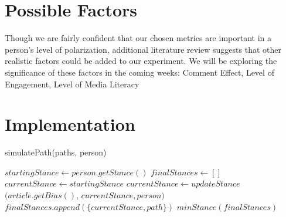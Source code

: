 \documentclass[11pt,reqno]{proc}
\begin{document}
\section{Possible Factors}
\hspace{\parindent} Though we are fairly confident that our chosen metrics are important in a person’s level of polarization, additional literature review suggests that other realistic factors could be added to our experiment. We will be exploring the significance of these factors in the coming weeks: Comment Effect, Level of Engagement, Level of Media Literacy
\section {Implementation}
\begin{center}
\end{center}

\begin{algorithm}
\caption{simulatePath(paths, person)}
\begin{algorithmic} 
\STATE $startingStance \leftarrow person.getStance()$
\STATE $finalStances \leftarrow [ ]$
\STATE $currentStance \leftarrow startingStance$
\STATE $currentStance \leftarrow updateStance$$(article.getBias()$, $currentStance, person)$
\ENDFOR
\STATE $finalStances.append(\{currentStance, path\})$
\ENDFOR
\RETURN $minStance(finalStances)$
\end{algorithmic}
\end{algorithm}
\end{document}
